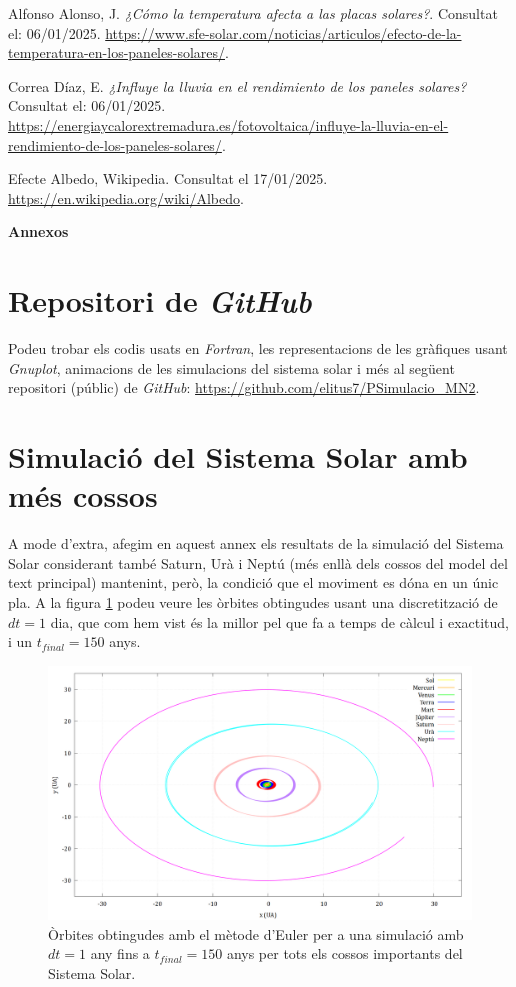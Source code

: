 \documentclass[10pt, twoside, a4paper]{article}
\begin{document}
\begin{thebibliography}{99}
    Alfonso Alonso, J. \textit{¿Cómo la temperatura afecta a las placas solares?}. Consultat el: 06/01/2025. \url{https://www.sfe-solar.com/noticias/articulos/efecto-de-la-temperatura-en-los-paneles-solares/}.

    Correa Díaz, E. \textit{¿Influye la lluvia en el rendimiento de los paneles solares?} Consultat el: 06/01/2025. \url{https://energiaycalorextremadura.es/fotovoltaica/influye-la-lluvia-en-el-rendimiento-de-los-paneles-solares/}.

     Efecte Albedo, Wikipedia. Consultat el 17/01/2025. \url{https://en.wikipedia.org/wiki/Albedo}.
\end{thebibliography}

\newpage
\appendix
{\Huge{\textbf{Annexos}}}
\section{Repositori de \textit{GitHub}}
\label{an:a}
Podeu trobar els codis usats en \textit{Fortran}, les representacions de les gràfiques usant \textit{Gnuplot}, animacions de les simulacions del sistema solar i més al següent repositori (públic) de \textit{GitHub}: \url{https://github.com/elitus7/PSimulacio_MN2}.

\section{Simulació del Sistema Solar amb més cossos}
\label{an:b}
A mode d'extra, afegim en aquest annex els resultats de la simulació del Sistema Solar considerant també Saturn, Urà i Neptú (més enllà dels cossos del model del text principal) mantenint, però, la condició que el moviment es dóna en un únic pla. A la figura \ref{fig:an1} podeu veure les òrbites obtingudes usant una discretització de $dt=1$ dia, que com hem vist és la millor pel que fa a temps de càlcul i exactitud, i un $t_{final}=150$ anys.

\begin{figure}[h]
    \centering
    \includegraphics[width=1.0\linewidth]{../sist_solar/orbites_euler_TOTS_150_d1dia.png}
    \caption{Òrbites obtingudes amb el mètode d'Euler per a una simulació amb $dt=1$ any fins a $t_{final}=150$ anys per tots els cossos importants del Sistema Solar.}
    \label{fig:an1}
\end{figure}
\end{document}
